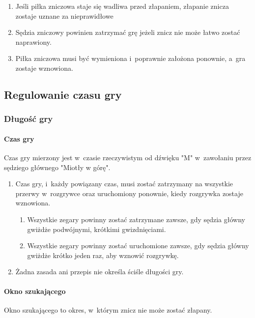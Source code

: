 \documentclass[12pt]{article}
\begin{document}
\begin{enumerate}
\begin{enumerate}
		      \item Jeśli piłka zniczowa staje się wadliwa przed złapaniem, złapanie
		            znicza zostaje uznane za nieprawidłowe

		      \item Sędzia zniczowy powinien zatrzymać grę jeżeli znicz nie może łatwo
		            zostać naprawiony.

		      \item Piłka zniczowa musi być wymieniona i~poprawnie założona ponownie, a~gra zostaje wznowiona.
	      \end{enumerate}
\end{enumerate}

\subsection{Regulowanie czasu gry}

\subsubsection{Długość gry}

\paragraph{Czas gry}
Czas gry mierzony jest w~czasie
rzeczywistym od dźwięku "M" w~zawołaniu przez sędziego głównego "Miotły
w górę".

\begin{enumerate}
	\item Czas gry, i~każdy powiązany czas, musi zostać zatrzymany na wszystkie
	      przerwy w~rozgrywce oraz uruchomiony ponownie, kiedy rozgrywka zostaje
	      wznowiona.
	      \begin{enumerate}
		      \item Wszystkie zegary powinny zostać zatrzymane zawsze, gdy sędzia główny
		            gwiżdże podwójnymi, krótkimi gwizdnięciami.

		      \item Wszystkie zegary powinny zostać uruchomione zawsze, gdy sędzia
		            główny gwiżdże krótko jeden raz, aby wznowić rozgrywkę.
	      \end{enumerate}

	\item Żadna zasada ani przepis nie określa ściśle długości gry.
\end{enumerate}

\paragraph{Okno szukającego}
Okno szukającego to okres, w~którym
znicz nie może zostać złapany.
\end{document}
